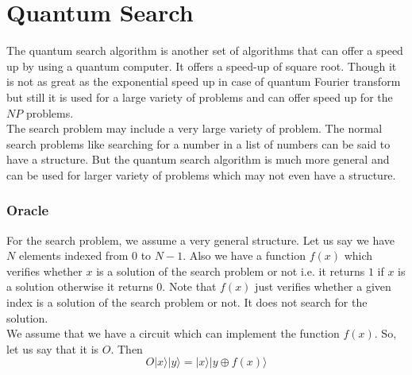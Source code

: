 \chapter{Quantum Search}
The quantum search algorithm is another set of algorithms that can offer a speed up by using a quantum computer. It offers a speed-up of square root. Though it is not as great as the exponential speed up in case of quantum Fourier transform but still it is used for a large variety of problems and can offer speed up for the $NP$ problems.\\
The search problem may include a very large variety of problem. The normal search problems like searching for a number in a list of numbers can be said to have a structure. But the quantum search algorithm is much more general and can be used for larger variety of problems which may not even have a structure.
\subsection{Oracle}
For the search problem, we assume a very general structure. Let us say we have $N$ elements indexed from $0$ to $N-1$. Also we have a function $f(x)$ which verifies whether $x$ is a solution of the search problem or not i.e. it returns $1$ if $x$ is a solution otherwise it returns $0$. Note that $f(x)$ just verifies whether a given index is a solution of the search problem or not. It does not search for the solution. \\
We assume that we have a circuit which can implement the function $f(x)$. So, let us say that it is $O$. Then
\begin{equation}
O|x\rangle|y\rangle = |x\rangle |y \oplus f(x) \rangle
\end{equation}
